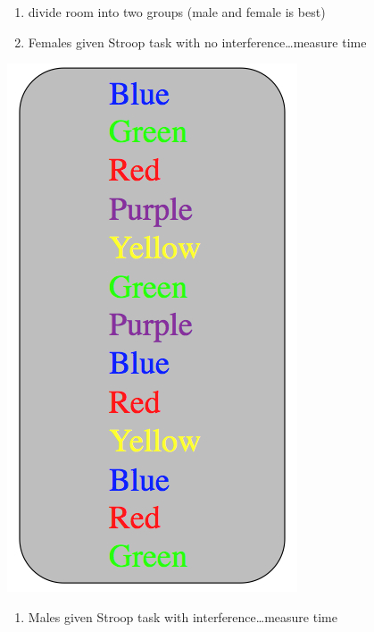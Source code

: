 \documentclass[11pt]{article}
\begin{document}
\begin{enumerate}
\item divide room into two groups (male and female is best)
\item Females given Stroop task with no interference\ldots{}measure time
\end{enumerate}
\includegraphics[width=.9\linewidth]{figures/list1.jpg}

\begin{enumerate}
\item Males given Stroop task with interference\ldots{}measure time
\end{enumerate}
\end{document}
